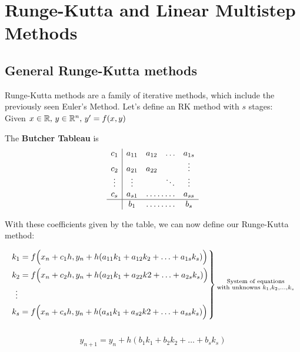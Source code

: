 \section{Runge-Kutta and Linear Multistep Methods}

\subsection{General Runge-Kutta methods}

Runge-Kutta methods are a family of iterative methods, which include the previously seen Euler's Method. Let's define an RK method with $s$ stages:\\

Given $x\in \mathbb{R}, \, y\in\mathbb{R}^n,\, y'=f(x,y)$

\begin{definition}
  The \textbf{Butcher Tableau} is 
  $$\begin{array}{c|c c c c}
     c_1    & a_{11} & a_{12} & \ldots  & a_{1s} \\
     c_2    & a_{21} & a_{22} &         & \vdots \\
     \vdots & \vdots &        & \ddots  & \vdots \\
     c_s    & a_{s1} & \hdotsfor{2}     & a_{ss} \\
     \hline
            & b_1    & \hdotsfor{2}     & b_s
  \end{array}$$
\end{definition}

With these coefficients given by the table, we can now define our Runge-Kutta method:

$$
\begin{rcases}
  k_1 = f\Big(x_n + c_1h, y_n + h(a_{11}k_1 + a_{12}k_2 + \ldots + a_{1s}k_s)\Big)\\
  k_2 = f\Big(x_n + c_2h, y_n + h(a_{21}k_1 + a_{22}k2 + \ldots + a_{2s}k_s)\Big) \\
  \hspace{0.15cm}\vdots \\
  k_s = f\Big(x_n + c_sh, y_n + h(a_{s1}k_1 + a_{s2}k2 + \ldots + a_{ss}k_s)\Big)
\end{rcases} \substack{\text{System of equations} \\ \text{with unknowns } k_1, k_2, \ldots, k_s}
$$\-\\

$$\boxed{y_{n+1} = y_n + h(b_1k_1 + b_2k_2 + \ldots + b_sk_s)}$$

\-\\

